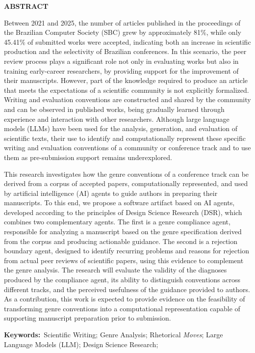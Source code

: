 \begin{center}
    \textbf{ABSTRACT}
    \vspace{10pt}
\end{center}

Between 2021 and 2025, the number of articles published in the proceedings of the Brazilian Computer Society (SBC) grew by approximately 81\%, while only 45.41\% of submitted works were accepted, indicating both an increase in scientific production and the selectivity of Brazilian conferences. In this scenario, the peer review process plays a significant role not only in evaluating works but also in training early-career researchers, by providing support for the improvement of their manuscripts. However, part of the knowledge required to produce an article that meets the expectations of a scientific community is not explicitly formalized. Writing and evaluation conventions are constructed and shared by the community and can be observed in published works, being gradually learned through experience and interaction with other researchers. Although large language models (LLMs) have been used for the analysis, generation, and evaluation of scientific texts, their use to identify and computationally represent these specific writing and evaluation conventions of a community or conference track and to use them as pre-submission support remains underexplored.

This research investigates how the genre conventions of a conference track can be derived from a corpus of accepted papers, computationally represented, and used by artificial intelligence (AI) agents to guide authors in preparing their manuscripts. To this end, we propose a software artifact based on AI agents, developed according to the principles of Design Science Research (DSR), which combines two complementary agents. The first is a genre compliance agent, responsible for analyzing a manuscript based on the genre specification derived from the corpus and producing actionable guidance. The second is a rejection boundary agent, designed to identify recurring problems and reasons for rejection from actual peer reviews of scientific papers, using this evidence to complement the genre analysis. The research will evaluate the validity of the diagnoses produced by the compliance agent, its ability to distinguish conventions across different tracks, and the perceived usefulness of the guidance provided to authors. As a contribution, this work is expected to provide evidence on the feasibility of transforming genre conventions into a computational representation capable of supporting manuscript preparation prior to submission.

\vspace{20pt}

\textbf{Keywords:}~Scientific Writing; Genre Analysis; Rhetorical \textit{Moves}; Large Language Models (LLM); Design Science Research;

